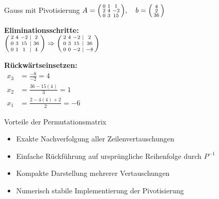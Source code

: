 \begin{example2}{Gauss mit Pivotisierung}
$A = \begin{psmallmatrix}
0 & 1 & 1\\
2 & 4 & -2\\
0 & 3 & 15
\end{psmallmatrix}, \quad b = \begin{psmallmatrix}
4\\
2\\
36
\end{psmallmatrix}$
\vspace{2mm}\\
\begin{minipage}[t]{0.5\textwidth}
    \textbf{Eliminationsschritte: }
    \vspace{2mm}\\
    $\begin{psmallmatrix}
    2 & 4 & -2 & | & 2\\
    0 & 3 & 15 & | & 36\\
    0 & 1 & 1 & | & 4
    \end{psmallmatrix}
    \Rightarrow
    \begin{psmallmatrix}
    2 & 4 & -2 & | & 2\\
    0 & 3 & 15 & | & 36\\
    0 & 0 & -2 & | & -8
    \end{psmallmatrix}$
\end{minipage}
\begin{minipage}[t]{0.45\textwidth}
    \textbf{Rückwärtseinsetzen: }
    \vspace{1mm}\\
$
\begin{array}{lrl}
    x_3 &= \frac{-8}{-2} = 4\\
    x_2 &= \frac{36 - 15(4)}{3} = 1\\
    x_1 &= \frac{2 - 4(4) + 2}{2} = -6
\end{array}
$
\end{minipage}
\end{example2}

\begin{concept}{Vorteile der Permutationsmatrix}
    \begin{itemize}
        \item Exakte Nachverfolgung aller Zeilenvertauschungen
        \item Einfache Rückführung auf ursprüngliche Reihenfolge durch $P^{-1}$
        \item Kompakte Darstellung mehrerer Vertauschungen
        \item Numerisch stabile Implementierung der Pivotisierung
    \end{itemize}
\end{concept}

